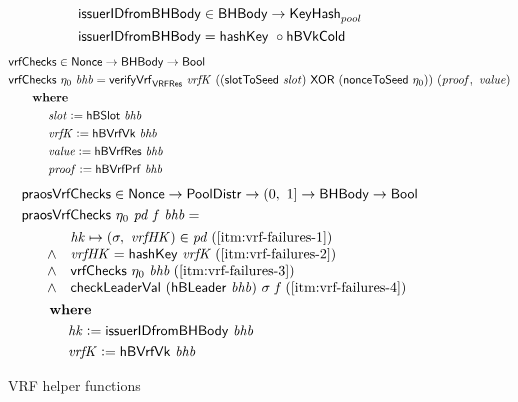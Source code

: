 \begin{figure}
  \begin{align*}
      & \mathsf{issuerIDfromBHBody} \in \mathsf{BHBody} \to \mathsf{KeyHash}_{pool} \\
      & \mathsf{issuerIDfromBHBody} = \mathsf{hashKey}~ \mathit{} \circ \mathsf{hBVkCold}~\mathit{} \\
  \end{align*}
  \begin{align*}
      & \mathsf{vrfChecks} \in \mathsf{Nonce} \to \mathsf{BHBody} \to \mathsf{Bool} \\
      & \mathsf{vrfChecks}~\eta_0~\mathit{bhb} =
          \mathsf{verifyVrf}_{\mathsf{VRFRes}} ~ \mathit{vrfK} ~ ((\mathsf{slotToSeed}~ \mathit{slot})~\mathsf{XOR}~(\mathsf{nonceToSeed}~ \eta_0)) ~(\mathit{proof},~\mathit{value}) \\
      & ~~~~~ ~ \mathbf{where}~ ~  \\
      & ~~~~~~~~~~\mathit{slot} \mathrel{\mathop:}= \mathsf{hBSlot}~\mathit{bhb} \\
      & ~~~~~~~~~~\mathit{vrfK} \mathrel{\mathop:}= \mathsf{hBVrfVk}~\mathit{bhb} \\
      & ~~~~~~~~~~\mathit{value} \mathrel{\mathop:}= \mathsf{hBVrfRes}~\mathit{bhb} \\
      & ~~~~~~~~~~\mathit{proof} \mathrel{\mathop:}= \mathsf{hBVrfPrf}~\mathit{bhb} \\
  \end{align*}
  \begin{align*}
      & \mathsf{praosVrfChecks} \in \mathsf{Nonce} \to \mathsf{PoolDistr} \to (0,~1] \to \mathsf{BHBody} \to \mathsf{Bool} \\
      & \mathsf{praosVrfChecks}~\eta_0~\mathit{pd}~\mathit{f}~\mathit{bhb} = \\
      & \begin{array}{cl}
        ~~~~ & \mathit{hk}\mapsto (\sigma,~\mathit{vrfHK})\in\mathit{pd} \; (\ref{itm:vrf-failures-1}) \\
        ~~~~ \land & \mathit{vrfHK} = \mathsf{hashKey}~ \mathit{vrfK} \; (\ref{itm:vrf-failures-2}) \\
        ~~~~ \land & \mathsf{vrfChecks}~\eta_0~\mathit{bhb} \; (\ref{itm:vrf-failures-3}) \\
        ~~~~ \land & \mathsf{checkLeaderVal}~(\mathsf{hBLeader}~\mathit{bhb})~\sigma~\mathit{f} \; (\ref{itm:vrf-failures-4}) \\
      \end{array} \\
      & ~~~~~ ~ \mathbf{where}~ ~  \\
      & ~~~~~~~~~~\mathit{hk} \mathrel{\mathop:}= \mathsf{issuerIDfromBHBody}~\mathit{bhb} \\
      & ~~~~~~~~~~\mathit{vrfK} \mathrel{\mathop:}= \mathsf{hBVrfVk}~\mathit{bhb} \\
  \end{align*}
  \caption{VRF helper functions}
  \label{fig:vrf-checks}
\end{figure}

